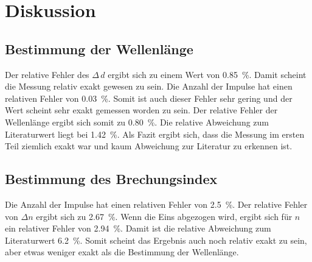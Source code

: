 \section{Diskussion}
\label{sec:Diskussion}

\subsection{Bestimmung der Wellenlänge}
Der relative Fehler des $\Delta \, d$ ergibt sich zu einem Wert von \SI{0.85}{\percent}. Damit scheint die Messung relativ exakt gewesen zu sein.  
Die Anzahl der Impulse hat einen relativen Fehler von \SI{0.03}{\percent}. Somit ist auch dieser Fehler sehr gering und der Wert scheint sehr exakt gemessen worden zu sein.  
Der relative Fehler der Wellenlänge ergibt sich somit zu \SI{0.80}{\percent}.
Die relative Abweichung zum Literaturwert liegt bei 
\SI{1.42}{\percent}.
Als Fazit ergibt sich, dass die Messung im ersten Teil ziemlich exakt war und kaum Abweichung zur Literatur zu erkennen ist. 

\subsection{Bestimmung des Brechungsindex}
Die Anzahl der Impulse hat einen relativen Fehler von \SI{2.5}{\percent}. 
Der relative Fehler von $\Delta n$ ergibt sich zu \SI{2.67}{\percent}.
Wenn die Eins abgezogen wird, ergibt sich für $n$ ein relativer Fehler von \SI{2.94}{\percent}. Damit ist die relative Abweichung zum Literaturwert \SI{6.2}{\percent}. Somit scheint das Ergebnis auch noch relativ exakt zu sein, aber etwas weniger exakt als die Bestimmung der Wellenlänge.